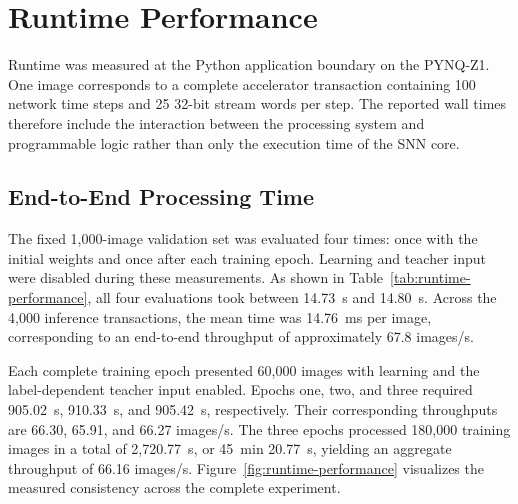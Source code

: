 \section{Runtime Performance}
\label{subsec:runtime-performance}

Runtime was measured at the Python application boundary on the PYNQ-Z1. One image corresponds to a complete accelerator transaction containing 100 network time steps and 25 32-bit stream words per step. The reported wall times therefore include the interaction between the processing system and programmable logic rather than only the execution time of the SNN core.

\subsection{End-to-End Processing Time}

The fixed 1,000-image validation set was evaluated four times: once with the initial weights and once after each training epoch. Learning and teacher input were disabled during these measurements. As shown in Table~\ref{tab:runtime-performance}, all four evaluations took between 14.73~s and 14.80~s. Across the 4,000 inference transactions, the mean time was 14.76~ms per image, corresponding to an end-to-end throughput of approximately 67.8 images/s.

Each complete training epoch presented 60,000 images with learning and the label-dependent teacher input enabled. Epochs one, two, and three required 905.02~s, 910.33~s, and 905.42~s, respectively. Their corresponding throughputs are 66.30, 65.91, and 66.27 images/s. The three epochs processed 180,000 training images in a total of 2,720.77~s, or 45~min 20.77~s, yielding an aggregate throughput of 66.16 images/s. Figure~\ref{fig:runtime-performance} visualizes the measured consistency across the complete experiment.

